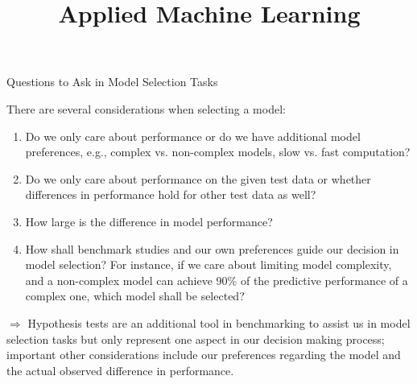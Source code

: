 \documentclass[11pt,compress,t,notes=noshow, aspectratio=169, xcolor=table]{beamer}
\title{Applied Machine Learning}
\date{}
\begin{document}
\newcommand{\titlefigure}{figure/normal_densities}
\newcommand{\learninggoals}{
\item What questions can we answer with benchmarks?
\item What value do hypothesis tests add?
\item Benchmarking scenarios and relevant tests}





\begin{frame}{Questions to Ask in Model Selection Tasks}

There are several considerations when selecting a model:
\vspace{0.25cm}
\begin{enumerate}
    \setlength\itemsep{1em}
    \item Do we only care about performance or do we have additional model preferences, e.g., complex vs. non-complex models, slow vs. fast computation?
    \item Do we only care about performance on the given test data or whether differences in performance hold for other test data as well?
    \item How large is the difference in model performance?
    \item How shall benchmark studies and our own preferences guide our decision in model selection? For instance, if we care about limiting model complexity, and a non-complex model can achieve 90\% of the predictive performance of a complex one, which model shall be selected?
\end{enumerate}
\vspace{0.5cm}
$\Rightarrow$ Hypothesis tests are an additional tool in benchmarking to assist us in model selection tasks but only represent one aspect in our decision making process; important other considerations include our preferences regarding the model and the actual observed difference in performance.



\end{frame}
\end{document}
